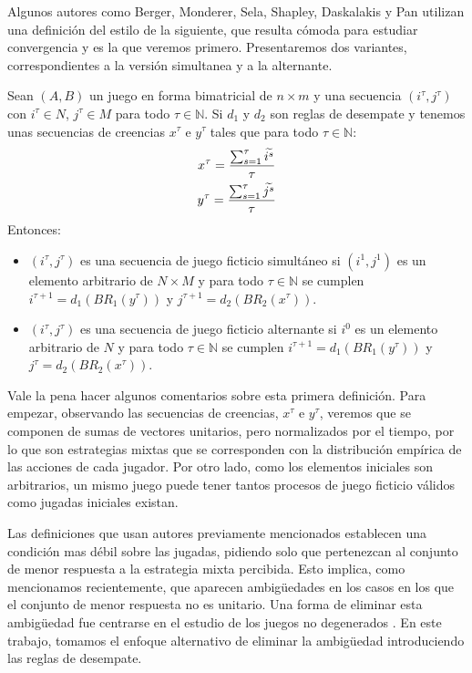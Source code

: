 Algunos autores como Berger, Monderer, Sela, Shapley, Daskalakis y Pan \cite{browns:original} \cite{no:cycling} \cite{2x2:without} \cite{identical:interests} \cite{counter:karlin:strong} utilizan una definición del estilo de la siguiente, que resulta cómoda para estudiar convergencia y es la que veremos primero. Presentaremos dos variantes, correspondientes a la versión simultanea y a la alternante.

\begin{definition} \label{def:fp:berger}
    Sean $(A, B)$ un juego en forma bimatricial de $n \times m$ y una secuencia $(i^\tau, j^\tau)$ con $i^\tau \in N$, $j^\tau \in M$ para todo $\tau \in \mathbb{N}$. Si $d_1$ y $d_2$ son reglas de desempate y tenemos unas secuencias de creencias $x^\tau$ e $y^\tau$ tales que para todo $\tau \in \mathbb{N}$:
    \begin{gather*}
        x^\tau= \frac{\sum^\tau_{s=1} \widetilde{i^s}}{\tau}  \\
        y^\tau= \frac{\sum^\tau_{s=1} \widetilde{j^s}}{\tau}
    \end{gather*}
    Entonces:
    \begin{itemize}
        \item $(i^\tau, j^\tau)$ es una secuencia de juego ficticio simultáneo si $(i^1, j^1)$ es un elemento arbitrario de $N \times M$ y para todo $\tau \in \mathbb{N}$ se cumplen $i^{\tau+1} = d_1(BR_1(y^\tau))$ y $j^{\tau+1} = d_2(BR_2(x^\tau))$.
        \item $(i^\tau, j^\tau)$ es una secuencia de juego ficticio alternante si $i^0$ es un elemento arbitrario de $N$ y para todo $\tau \in \mathbb{N}$ se cumplen $i^{\tau+1} = d_1(BR_1(y^\tau))$ y $j^{\tau} = d_2(BR_2(x^\tau))$.
    \end{itemize}
\end{definition}

Vale la pena hacer algunos comentarios sobre esta primera definición. Para empezar, observando las secuencias de creencias, $x^\tau$ e $y^\tau$, veremos que se componen de sumas de vectores unitarios, pero normalizados por el tiempo, por lo que son estrategias mixtas que se corresponden con la distribución empírica de las acciones de cada jugador. Por otro lado, como los elementos iniciales son arbitrarios, un mismo juego puede tener tantos procesos de juego ficticio válidos como jugadas iniciales existan.

Las definiciones que usan autores previamente mencionados establecen una condición mas débil sobre las jugadas, pidiendo solo que pertenezcan al conjunto de menor respuesta a la estrategia mixta percibida. Esto implica, como mencionamos recientemente, que aparecen ambigüedades en los casos en los que el conjunto de menor respuesta no es unitario. Una forma de eliminar esta ambigüedad fue centrarse en el estudio de los juegos no degenerados \cite{browns:original}. En este trabajo, tomamos el enfoque alternativo de eliminar la ambigüedad introduciendo las reglas de desempate.

